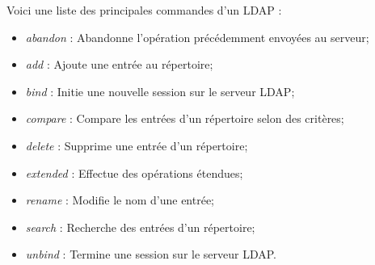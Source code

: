 Voici une liste des principales commandes d'un LDAP :
\begin{itemize}
    \item \textit{abandon} : Abandonne l'opération précédemment envoyées au serveur;
    \item \textit{add} : Ajoute une entrée au répertoire;
    \item \textit{bind} : Initie une nouvelle session sur le serveur LDAP;
    \item \textit{compare} : Compare les entrées d'un répertoire selon des critères;
    \item \textit{delete} : Supprime une entrée d'un répertoire;
    \item \textit{extended} : Effectue des opérations étendues;
    \item \textit{rename} : Modifie le nom d'une entrée;
    \item \textit{search} : Recherche des entrées d'un répertoire;
    \item \textit{unbind} : Termine une session sur le serveur LDAP.
\end{itemize}
